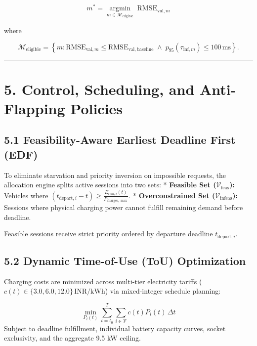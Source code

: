 \documentclass[
]{article}
\begin{document}
\[m^{*} = \underset{m \in \mathcal{M}_{\mathrm{eligible}}}{\operatorname{argmin}}\; \mathrm{RMSE}_{\mathrm{val},m}\]

where

\[\mathcal{M}_{\mathrm{eligible}} = \left\{m : \mathrm{RMSE}_{\mathrm{val},m} \leq \mathrm{RMSE}_{\mathrm{val,baseline}} \;\land\; p_{95}(\tau_{\mathrm{inf},m}) \leq 100\,\mathrm{ms}\right\}.\]

\vspace{0.5em}\noindent\textcolor{gridsenseblue}{\rule{\linewidth}{0.6pt}}\vspace{0.5em}

\section{5. Control, Scheduling, and Anti-Flapping
Policies}\label{control-scheduling-and-anti-flapping-policies}

\subsection{5.1 Feasibility-Aware Earliest Deadline First
(EDF)}\label{feasibility-aware-earliest-deadline-first-edf}

To eliminate starvation and priority inversion on impossible requests,
the allocation engine splits active sessions into two sets: *
\textbf{Feasible Set (\(\mathcal{V}_{\text{feas}}\)):} Vehicles where
\((t_{\text{depart}, i} - t) \ge \frac{E_{\text{rem}, i}(t)}{P_{\text{charger},\max}}\).
* \textbf{Overconstrained Set (\(\mathcal{V}_{\text{infeas}}\)):}
Sessions where physical charging power cannot fulfill remaining demand
before deadline.

Feasible sessions receive strict priority ordered by departure deadline
\(t_{\text{depart}, i}\).

\subsection{5.2 Dynamic Time-of-Use (ToU)
Optimization}\label{dynamic-time-of-use-tou-optimization}

Charging costs are minimized across multi-tier electricity tariffs
(\(c(t) \in \{3.0, 6.0, 12.0\}\,\mathrm{INR/kWh}\)) via mixed-integer
schedule planning:

\[\min_{P_i(t)} \sum_{t=t_0}^{T} \sum_{i \in \mathcal{V}} c(t) P_i(t)\,\Delta t\]
Subject to deadline fulfillment, individual battery capacity curves,
socket exclusivity, and the aggregate 9.5 kW ceiling.
\end{document}
